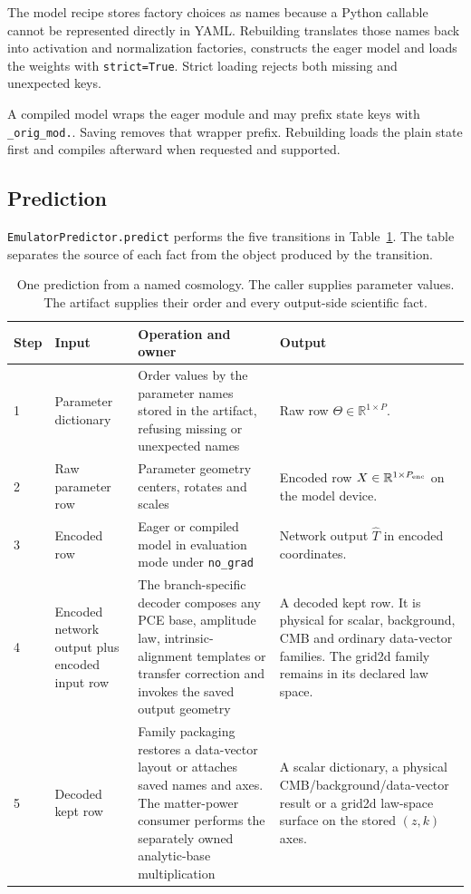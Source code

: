\documentclass[10pt,aps,prd,twocolumn,nofootinbib]{revtex4-2}
\newcommand{\code}[1]{\texttt{#1}}
\begin{document}
The model recipe stores factory choices as names because a Python callable
cannot be represented directly in YAML.  Rebuilding translates those names
back into activation and normalization factories, constructs the eager model
and loads the weights with \code{strict=True}.  Strict loading rejects both
missing and unexpected keys.

A compiled model wraps the eager module and may prefix state keys with
\code{\_orig\_mod.}.  Saving removes that wrapper prefix.  Rebuilding loads the
plain state first and compiles afterward when requested and supported.

\subsection{Prediction}

\code{EmulatorPredictor.predict} performs the five transitions in
Table~\ref{tab:prediction-trace}.  The table separates the source of each fact
from the object produced by the transition.

\begin{table}[t]
\centering
\begin{tabular}{p{}p{}p{}p{}}
\toprule
Step & Input & Operation and owner & Output \\
\midrule
1 & Parameter dictionary & Order values by the parameter names stored in the
artifact, refusing missing or unexpected names & Raw row
$\Theta\in\mathbb{R}^{1\times P}$.  \\
2 & Raw parameter row & Parameter geometry centers, rotates and scales &
Encoded row $X\in\mathbb{R}^{1\times P_{\rm enc}}$ on the model device.  \\
3 & Encoded row & Eager or compiled model in evaluation mode under
\code{no\_grad} & Network output $\widehat T$ in encoded coordinates.  \\
4 & Encoded network output plus encoded input row & The branch-specific
decoder composes any PCE base, amplitude law, intrinsic-alignment templates
or transfer correction and invokes the saved output geometry & A decoded kept
row.  It is physical for scalar, background, CMB and ordinary data-vector
families.  The grid2d family remains in its declared law space.  \\
5 & Decoded kept row & Family packaging restores a data-vector layout or
attaches saved names and axes.  The matter-power consumer performs the
separately owned analytic-base multiplication & A scalar dictionary, a
physical CMB/background/data-vector result or a grid2d law-space surface on
the stored $(z,k)$ axes.  \\
\bottomrule
\end{tabular}
\caption{One prediction from a named cosmology.  The caller supplies parameter
values.  The artifact supplies their order and every output-side scientific
fact.}
\label{tab:prediction-trace}
\end{table}
\end{document}
